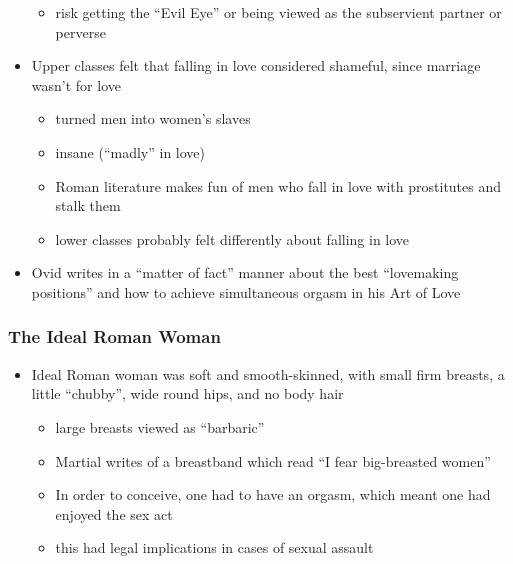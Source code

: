 \documentclass[12pt, twoside]{article}
\begin{document}
\begin{itemize}
\begin{itemize}
	\item risk getting the “Evil Eye” or being viewed as the subservient partner or perverse
	\end{itemize}
\item Upper classes felt that falling in love considered shameful, since marriage wasn’t for love
	\begin{itemize}
	\item turned men into women’s slaves
	\item insane (“madly” in love)
	\item Roman literature makes fun of men who fall in love with prostitutes and stalk them
	\item lower classes probably felt differently about falling in love
	\end{itemize}
\item Ovid writes in a “matter of fact” manner about the best “lovemaking positions” and how to achieve simultaneous orgasm in his Art of Love
\end{itemize}

\subsubsection{The Ideal Roman Woman}
\begin{itemize}
\item Ideal Roman woman was soft and smooth-skinned, with small firm breasts, a little “chubby”, wide round hips, and no body hair
	\begin{itemize}
	\item large breasts viewed as “barbaric”
	\item Martial writes of a breastband which read “I fear big-breasted women”
\item In order to conceive, one had to have an orgasm, which meant  one had enjoyed the sex act
	\item this had legal implications in cases of sexual assault
	\end{itemize}
\end{itemize}
\end{document}
